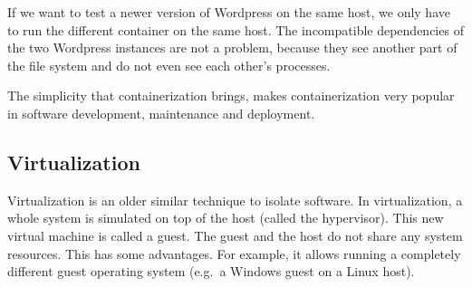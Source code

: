 If we want to test a newer version of Wordpress on the same host, we only have to run the different container on the same host. The incompatible dependencies of the two Wordpress instances are not a problem, because they see another part of the file system and do not even see each other's processes.

\medskip

The simplicity that containerization brings, makes containerization very popular in software development, maintenance and deployment.

\pagebreak

\subsection{Virtualization}
Virtualization is an older similar technique to isolate software. In virtualization, a whole system is simulated on top of the host (called the hypervisor). This new virtual machine is called a guest. The guest and the host do not share any system resources. This has some advantages. For example, it allows running a completely different guest operating system (e.g.\ a Windows guest on a Linux host).

